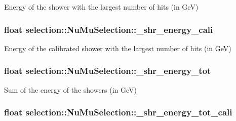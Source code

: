 Energy of the shower with the largest number of hits (in Ge\-V) \hypertarget{classselection_1_1NuMuSelection_a902fba92b860066bac4ba35e1e014891}{
\subsubsection[{\-\_\-shr\-\_\-energy\-\_\-cali}]{\setlength{\rightskip}{0pt plus 5cm}float selection\-::\-Nu\-Mu\-Selection\-::\-\_\-shr\-\_\-energy\-\_\-cali\hspace{0.3cm}{\ttfamily [private]}}}\label{classselection_1_1NuMuSelection_a902fba92b860066bac4ba35e1e014891}
Energy of the calibrated shower with the largest number of hits (in Ge\-V) \hypertarget{classselection_1_1NuMuSelection_a73da6cca89a0a1a854297f4d0a2ac851}{
\subsubsection[{\-\_\-shr\-\_\-energy\-\_\-tot}]{\setlength{\rightskip}{0pt plus 5cm}float selection\-::\-Nu\-Mu\-Selection\-::\-\_\-shr\-\_\-energy\-\_\-tot\hspace{0.3cm}{\ttfamily [private]}}}\label{classselection_1_1NuMuSelection_a73da6cca89a0a1a854297f4d0a2ac851}
Sum of the energy of the showers (in Ge\-V) \hypertarget{classselection_1_1NuMuSelection_a1401935e64b23d52ece082c731c87624}{
\subsubsection[{\-\_\-shr\-\_\-energy\-\_\-tot\-\_\-cali}]{\setlength{\rightskip}{0pt plus 5cm}float selection\-::\-Nu\-Mu\-Selection\-::\-\_\-shr\-\_\-energy\-\_\-tot\-\_\-cali\hspace{0.3cm}{\ttfamily [private]}}}\label{classselection_1_1NuMuSelection_a1401935e64b23d52ece082c731c87624}

